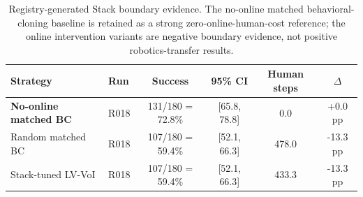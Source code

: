\begin{table}[t]
\centering
\caption{Registry-generated Stack boundary evidence. The no-online matched behavioral-cloning baseline is retained as a strong zero-online-human-cost reference; the online intervention variants are negative boundary evidence, not positive robotics-transfer results.}
\label{tab:stack_boundary_appendix}
\begin{tabular}{llcccc}
\toprule
Strategy & Run & Success & 95\% CI & Human steps & $\Delta$ \\
\midrule
\textbf{No-online matched BC} & R018 & 131/180 = 72.8\% & [65.8, 78.8] & 0.0 & +0.0 pp \\
Random matched BC & R018 & 107/180 = 59.4\% & [52.1, 66.3] & 478.0 & -13.3 pp \\
Stack-tuned LV-VoI & R018 & 107/180 = 59.4\% & [52.1, 66.3] & 433.3 & -13.3 pp \\
\bottomrule
\end{tabular}
\end{table}
